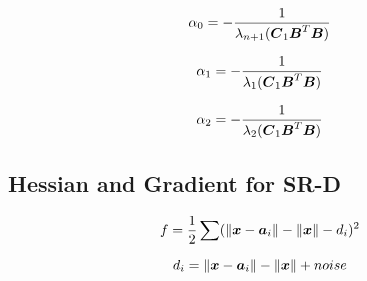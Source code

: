 \begin{equation}
\alpha_0 = -\frac{1}{\lambda_{n+1}(\BC_1\BB^T\BB)}
\end{equation}

\begin{equation}
\alpha_1 = -\frac{1}{\lambda_1(\BC_1\BB^T\BB)}
\end{equation}

\begin{equation}
\alpha_2 = -\frac{1}{\lambda_2(\BC_1\BB^T\BB)}
\end{equation}

\subsection{Hessian and Gradient for SR-D}

\begin{equation}
f = \frac{1}{2} \sum (\|\Bx - \Ba_i\| - \|\Bx\| - d_i)^2
\end{equation}

\begin{equation}
d_i = \|\Bx - \Ba_i\| - \|\Bx\| + noise
\end{equation}

